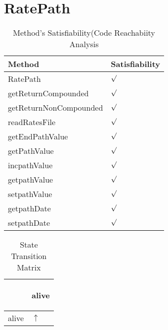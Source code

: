 \documentclass[10pt]{article}
\begin{document}
\section{{\color{Fuchsia}RatePath}}
\label{RatePath}
\begin{longtable}{|l|l|}
\caption{Method's Satisfiability(Code Reachabiity Analysis}\\
\hline
Method & Satisfiability\\
\hline
RatePath&{\color{blue}$\surd$}\\
\hline
getReturnCompounded&{\color{blue}$\surd$}\\
\hline
getReturnNonCompounded&{\color{blue}$\surd$}\\
\hline
readRatesFile&{\color{blue}$\surd$}\\
\hline
getEndPathValue&{\color{blue}$\surd$}\\
\hline
getPathValue&{\color{blue}$\surd$}\\
\hline
incpathValue&{\color{blue}$\surd$}\\
\hline
getpathValue&{\color{blue}$\surd$}\\
\hline
setpathValue&{\color{blue}$\surd$}\\
\hline
getpathDate&{\color{blue}$\surd$}\\
\hline
setpathDate&{\color{blue}$\surd$}\\
\hline
\end{longtable}
\begin{longtable}{|l|l|}
\caption{State Transition Matrix}\\
\hline
&\begin{sideways}alive\end{sideways}\\
\hline
alive&{\color{blue}$\uparrow$}\\
\hline
\end{longtable}
\end{document}
